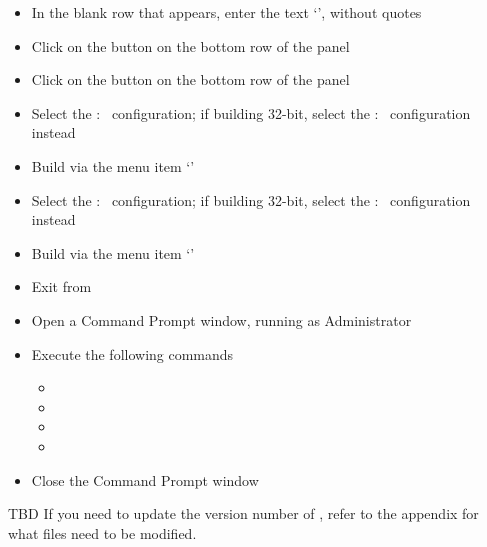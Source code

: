 \begin{itemize}
\item\exSp{}In the blank row that appears, enter the text
`',
without quotes
\item\exSp{}Click on the  button on the bottom row of the
 panel
\item\exSp{}Click on the  button on the bottom row of the
 panel
\item\exSp{}Select the  :\  configuration; if building 32-bit,
select the  :\  configuration instead
\item\exSp{}Build via the menu item `'
\item\exSp{}Select the  :\  configuration; if building 32-bit,
select the  :\  configuration instead
\item\exSp{}Build via the menu item `'
\item\exSp{}Exit from 
\item\exSp{}Open a Command Prompt window, running as Administrator
\item\exSp{}Execute the following commands
\begin{itemize}
\item{}
\item\exSp{}
\item\exSp{}
\item\exSp{}
\end{itemize}
\item\exSp{}Close the Command Prompt window
\end{itemize}
\tertiaryEnd
{}
TBD
\tertiaryEnd
\secondaryEnd
{}
If you need to update the version number of \mplusm, refer to the
 appendix for what files
need to be modified.

